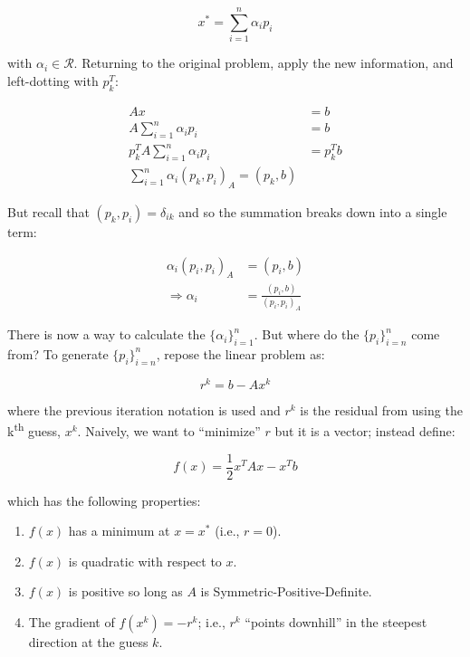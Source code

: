 \documentclass[a4paper, 12pt]{article}
\begin{document}
\begin{equation}
x^* = \sum_{i=1}^n \alpha_i p_i
\end{equation}

\noindent
with $\alpha_i \in \mathcal{R}$. 
Returning to the original problem,
apply the new information, 
and left-dotting with $p^T_k$:

\begin{align}
Ax &= b \\
A\sum_{i=1}^n \alpha_i p_i &= b \\
p_k^T A \sum_{i=1}^n \alpha_i p_i &= p_k^T b \\
\sum_{i=1}^n \alpha_i (p_k,p_i)_A = (p_k,b)
\end{align}

\noindent
But recall that $(p_k,p_i)=\delta_{ik}$ and so
the summation breaks down into a single term:

\begin{align}
\alpha_i (p_i,p_i)_A &= (p_i,b) \\
\Rightarrow
  \alpha_i &= \frac{ (p_i,b)}{ (p_i,p_i)_A}
\end{align}

\noindent
There is now a way to calculate the $\{\alpha_i\}_{i=1}^n$.
But where do the $\{p_i\}_{i=n}^n$ come from?
To generate $\{p_i\}_{i=n}^n$, 
repose the linear problem as:

\begin{equation}
r^k = b - A x^k
\end{equation}

\noindent
where the previous iteration notation is used 
and $r^k$ is the residual from using 
the k\textsuperscript{th} guess, $x^k$.
Naively, we want to ``minimize'' $r$ but it is a vector;
instead define:

\begin{equation}
f(x) = \frac{1}{2} x^T A x - x^T b
\end{equation}

\noindent
which has the following properties:
\begin{enumerate}
  \item $f(x)$ has a minimum at $x=x^*$ (i.e., $r = 0$).
  \item $f(x)$ is quadratic with respect to $x$.
  \item $f(x)$ is positive so long as $A$ is Symmetric-Positive-Definite.
  \item The gradient of $f(x^k)=-r^k$; 
          i.e., $r^k$ ``points downhill'' in the steepest direction at
          the guess $k$.
\end{enumerate}
\end{document}
